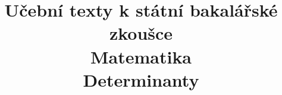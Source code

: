\clearpage

\clearpage

\title{\LARGE Učební texty k státní bakalářské zkoušce \\ Matematika \\ Determinanty}



\maketitle

\newpage
\setcounter{section}{12}



